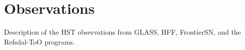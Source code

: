 \section{Observations}\label{sec:Observations}

Description of the HST observations from GLASS, HFF, FrontierSN, and the Refsdal-ToO programs. 

